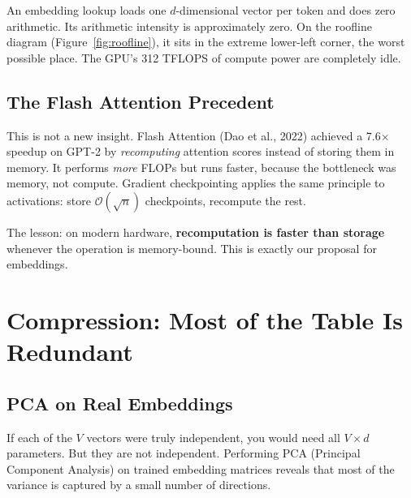 \documentclass[11pt, a4paper]{article}
\newcommand{\bigO}{\mathcal{O}}
\theoremstyle{remark}
\begin{document}
An embedding lookup loads one $d$-dimensional vector per token and does zero arithmetic.
Its arithmetic intensity is approximately zero.
On the roofline diagram (Figure~\ref{fig:roofline}), it sits in the extreme lower-left corner, the worst possible place.
The GPU's 312 TFLOPS of compute power are completely idle.

\subsection{The Flash Attention Precedent}

This is not a new insight.
Flash Attention (Dao et al., 2022) achieved a 7.6$\times$ speedup on GPT-2 by \emph{recomputing} attention scores instead of storing them in memory.
It performs \emph{more} FLOPs but runs faster, because the bottleneck was memory, not compute.
Gradient checkpointing applies the same principle to activations: store $\bigO(\sqrt{n})$ checkpoints, recompute the rest.

The lesson: on modern hardware, \textbf{recomputation is faster than storage} whenever the operation is memory-bound.
This is exactly our proposal for embeddings.


\section{Compression: Most of the Table Is Redundant}
\label{sec:compression}

\subsection{PCA on Real Embeddings}

If each of the $V$ vectors were truly independent, you would need all $V \times d$ parameters.
But they are not independent.
Performing PCA (Principal Component Analysis) on trained embedding matrices reveals that most of the variance is captured by a small number of directions.
\end{document}
